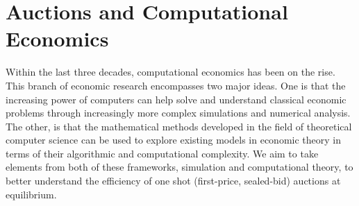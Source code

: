 \documentclass[12pt,twoside]{reedthesis}
\begin{document}
	
\chapter{Auctions and Computational Economics}
	Within the last three decades, computational economics has been on the rise. This branch of economic research encompasses two major ideas. One is that the increasing power of computers can help solve and understand classical economic problems through increasingly more complex simulations and numerical analysis. The other, is that the mathematical methods developed in the field of theoretical computer science can be used to explore existing models in economic theory in terms of their algorithmic and computational complexity. We aim to take elements from both of these frameworks, simulation and computational theory, to better understand the efficiency of one shot (first-price, sealed-bid) auctions at equilibrium. 
\end{document}
